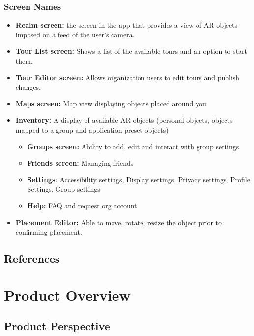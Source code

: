 \documentclass{article}
\begin{document}
\subsubsection{Screen Names}
\begin{itemize}
    \item \textbf{Realm screen:} the screen in the app that provides a view of AR objects imposed on a feed of the user’s camera.
    \item \textbf{Tour List screen:} Shows a list of the available tours and an option to start them.
    \item \textbf{Tour Editor screen:} Allows organization users to edit tours and publish changes.
    \item \textbf{Maps screen:} Map view displaying objects placed around you
    \item \textbf{Inventory:} A display of available AR objects (personal objects, objects mapped to a group and application preset objects)
          \begin{itemize}
              \item \textbf{Groups screen:} Ability to add, edit and interact with group settings
              \item \textbf{Friends screen:} Managing friends
              \item \textbf{Settings:} Accessibility settings, Display settings, Privacy settings, Profile Settings, Group settings
              \item \textbf{Help:} FAQ and request org account
          \end{itemize}
    \item \textbf{Placement Editor:} Able to move, rotate, resize the object prior to confirming placement.
\end{itemize}

\subsection{References}
\label{sub:references}

\begingroup
\raggedright

\endgroup



\section{Product Overview}

\subsection{Product Perspective}
\end{document}
